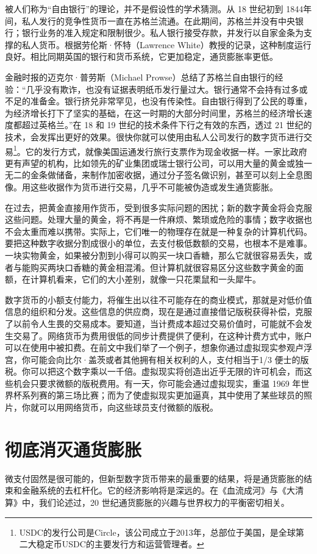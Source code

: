 被人们称为“自由银行”的理论，并不是假设性的学术猜测。从 18 世纪初到 1844年间，私人发行的竞争性货币一直在苏格兰流通。在此期间，苏格兰并没有中央银行；银行业务的准入规定和限制很少。私人银行接受存款，并发行以自家金条为支撑的私人货币。根据劳伦斯·怀特（Lawrence White）教授的记录，这种制度运行良好。相比同期英国的银行和货币系统，它更加稳定，通货膨胀率更低。

金融时报的迈克尔·普劳斯（Michael Prowse）总结了苏格兰自由银行的经验：“几乎没有欺诈，也没有证据表明纸币发行量过大。银行通常不会持有过多或不足的准备金。银行挤兑非常罕见，也没有传染性。自由银行得到了公民的尊重，为经济增长打下了坚实的基础，在这一时期的大部分时间里，苏格兰的经济增长速度都超过英格兰。”在 18 和 19 世纪的技术条件下行之有效的东西，透过 21 世纪的技术，会发挥出更好的效果。很快你就可以使用由私人公司发行的数字货币进行交易\footnote{‌USDC的发行公司是Circle‌，该公司成立于2013年，总部位于美国，是全球第二大稳定币USDC的主要发行方和运营管理者。‌‌}。它的发行方式，就像美国运通发行旅行支票作为现金收据一样。一家比政府更有声望的机构，比如领先的矿业集团或瑞士银行公司，可以用大量的黄金或独一无二的金条做储备，来制作加密收据，通过分子签名做识别，甚至可以刻上全息图像。用这些收据作为货币进行交易，几乎不可能被伪造或发生通货膨胀。

在过去，把黄金直接用作货币，受到很多实际问题的困扰；新的数字黄金将会克服这些问题。处理大量的黄金，将不再是一件麻烦、繁琐或危险的事情；数字收据也不会太重而难以携带。实际上，它们唯一的物理存在就是一种复杂的计算机代码。要把这种数字收据分割成很小的单位，去支付极低数额的交易，也根本不是难事。一块实物黄金，如果被分割到小得可以购买一块口香糖，那么它就很容易丢失，或者与能购买两块口香糖的黄金相混淆。但计算机就很容易区分这些数字黄金的面额，在计算机看来，它们的大小差别，就像一只花栗鼠和一头犀牛。

数字货币的小额支付能力，将催生出以往不可能存在的商业模式，那就是对低价值信息的组织和分发。这些信息的供应商，现在是通过直接借记版税获得补偿，克服了以前令人生畏的交易成本。要知道，当计费成本超过交易价值时，可能就不会发生交易了。网络货币为费用很低的同步计费提供了便利，在这种计费方式中，账户可以在使用中被扣费。在前文中我们举了一个例子，想象你通过虚拟现实参观卢浮宫，你可能会向比尔·盖茨或者其他拥有相关权利的人，支付相当于1/3 便士的版税。你可以把这个数字乘以一千倍。虚拟现实将创造出近乎无限的许可机会，而这些机会只要求微额的版税费用。有一天，你可能会通过虚拟现实，重温 1969 年世界杯系列赛的第三场比赛；而为了使虚拟现实更加逼真，其中使用了某些球员的照片，你就可以用网络货币，向这些球员支付微额的版税。

\section{彻底消灭通货膨胀}
微支付固然是很可能的，但新型数字货币带来的最重要的结果，将是通货膨胀的结束和金融系统的去杠杆化。它的经济影响将是深远的。在《血流成河》与《大清算》中，我们论述过，20 世纪通货膨胀的兴趣与世界权力的平衡密切相关。

